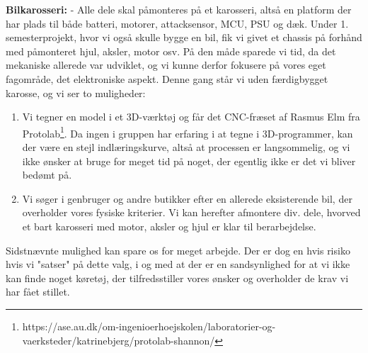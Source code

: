 \textbf{Bilkarosseri:}
- Alle dele skal påmonteres på et karosseri, altså en platform der har plads til både batteri, motorer, attacksensor, MCU, PSU og dæk.
Under 1. semesterprojekt, hvor vi også skulle bygge en bil, fik vi givet et chassis på forhånd med påmonteret hjul, aksler, motor osv. På den måde sparede vi tid, da det mekaniske allerede var udviklet, og vi kunne derfor fokusere på vores eget fagområde, det elektroniske aspekt.
Denne gang står vi uden færdigbygget karosse, og vi ser to muligheder:
\begin{enumerate}
    \item Vi tegner en model i et 3D-værktøj og får det CNC-fræset af Rasmus Elm fra Protolab\footnote{https://ase.au.dk/om-ingenioerhoejskolen/laboratorier-og-vaerksteder/katrinebjerg/protolab-shannon/}. Da ingen i gruppen har erfaring i at tegne i 3D-programmer, kan der være en stejl indlæringskurve, altså at processen er langsommelig, og vi ikke ønsker at bruge for meget tid på noget, der egentlig ikke er det vi bliver bedømt på. %
\item Vi søger i genbruger og andre butikker efter en allerede eksisterende bil, der overholder vores fysiske kriterier. Vi kan herefter afmontere div. dele, hvorved et bart karosseri med motor, aksler og hjul er klar til berarbejdelse.
\end{enumerate}
Sidstnævnte mulighed kan spare os for meget arbejde. Der er dog en hvis risiko hvis vi "satser" på dette valg, i og med at der er en sandsynlighed for at vi ikke kan finde noget køretøj, der tilfredsstiller vores ønsker og overholder de krav vi har fået stillet.
